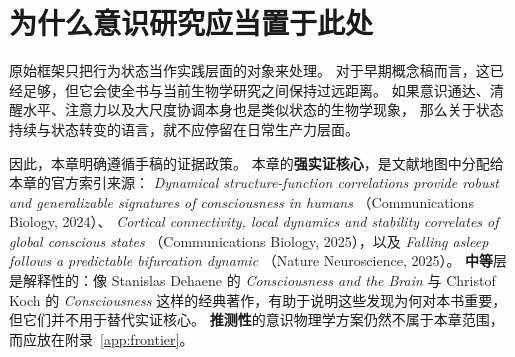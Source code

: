 \section{为什么意识研究应当置于此处}

原始框架只把行为状态当作实践层面的对象来处理。
对于早期概念稿而言，这已经足够，但它会使全书与当前生物学研究之间保持过远距离。
如果意识通达、清醒水平、注意力以及大尺度协调本身也是类似状态的生物学现象，
那么关于状态持续与状态转变的语言，就不应停留在日常生产力层面。

因此，本章明确遵循手稿的证据政策。
本章的\textbf{强实证核心}，是文献地图中分配给本章的官方索引来源：
\emph{Dynamical structure-function correlations provide robust and generalizable signatures of consciousness in humans}
（Communications Biology, 2024）、
\emph{Cortical connectivity, local dynamics and stability correlates of global conscious states}
（Communications Biology, 2025），以及
\emph{Falling asleep follows a predictable bifurcation dynamic}
（Nature Neuroscience, 2025）。
\textbf{中等}层是解释性的：像 Stanislas Dehaene 的 \emph{Consciousness and the Brain}
与 Christof Koch 的 \emph{Consciousness} 这样的经典著作，有助于说明这些发现为何对本书重要，
但它们并不用于替代实证核心。
\textbf{推测性}的意识物理学方案仍然不属于本章范围，而应放在附录~\ref{app:frontier}。